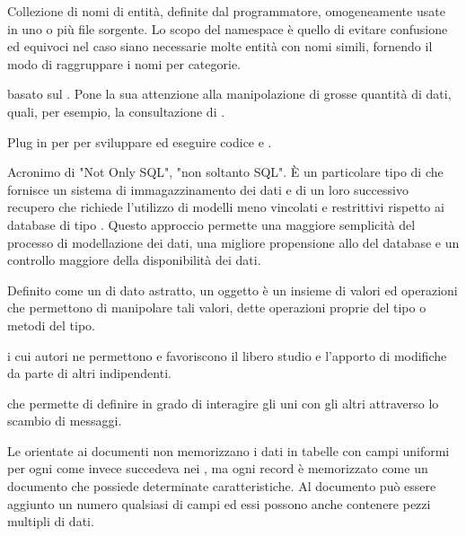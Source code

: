 
{Collezione di nomi di entità, definite dal programmatore, omogeneamente usate in uno o più file sorgente. Lo scopo del namespace è quello di evitare confusione ed equivoci nel caso siano necessarie molte entità con nomi simili, fornendo il modo di raggruppare i nomi per categorie.}

{ basato sul  . Pone la sua attenzione alla manipolazione di grosse quantità di dati, quali, per esempio, la consultazione di .}

{Plug in per  per sviluppare ed eseguire codice  e .}

{Acronimo di "Not Only SQL", "non soltanto SQL". \`{E} un particolare tipo di  che fornisce un sistema di immagazzinamento dei dati e di un loro successivo recupero che richiede l'utilizzo di modelli meno vincolati e restrittivi rispetto ai database di tipo . Questo approccio permette una maggiore semplicità del processo di modellazione dei dati, una migliore propensione allo  del database e un controllo maggiore della disponibilità dei dati.}




{Definito come un  di dato astratto, un oggetto è un insieme di valori ed operazioni che permettono di manipolare tali valori, dette operazioni proprie del tipo o metodi del tipo.}

{ i cui autori ne permettono e favoriscono il libero studio e l'apporto di modifiche da parte di altri  indipendenti.}

{ che permette di definire  in grado di interagire gli uni con gli altri attraverso lo scambio di messaggi.}

{Le  orientate ai documenti non memorizzano i dati in tabelle con campi uniformi per ogni  come invece succedeva nei  , ma ogni record è memorizzato come un documento che possiede determinate caratteristiche. Al documento può essere aggiunto un numero qualsiasi di campi ed essi possono anche contenere pezzi multipli di dati.}

